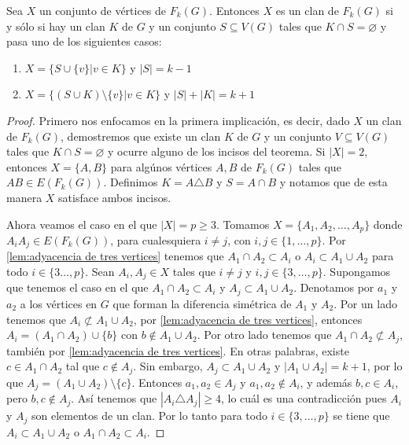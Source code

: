     \begin{teorema}
    \label{teo:relacion clan en G y F(G)}
        Sea $X$ un conjunto de v\'ertices de $F_k(G)$. Entonces $X$ es un clan
        de $F_k(G)$ si y s\'olo si hay un clan $K$ de $G$ y un conjunto $S
        \subseteq V(G)$ tales que $K \cap S = \varnothing$ y pasa uno de los
        siguientes casos:
        \begin{enumerate}
            \item $X = \{S \cup \{v\}| v \in K\}$ y $|S| = k-1$
            \item $X = \{(S\cup K) \setminus \{v\}| v \in K \}$ y $|S| + |K| =
            k+1$
        \end{enumerate}
    \end{teorema}

    \begin{proof}
        Primero nos enfocamos en la primera implicaci\'on, es decir, dado $X$ un
        clan de $F_k(G)$, demostremos que existe un clan $K$ de $G$ y un
        conjunto $V \subseteq V(G)$ tales que $K \cap S = \varnothing$ y ocurre
        alguno de los incisos del teorema. Si $|X|=2$, entonces $X= \{A, B\}$
        para alg\'unos v\'ertices $A, B$ de $F_k(G)$ tales que $AB \in
        E(F_k(G))$. Definimos $K = A \triangle B$ y $S=A \cap B$ y notamos que
        de esta manera $X$ satisface ambos incisos.

        Ahora veamos el caso en el que $|X|= p \geq 3$. Tomamos $X=\{A_1, A_2,
        \dots, A_p\}$ donde $A_i{A_j} \in E(F_k(G))$, para cualesquiera $i\neq
        j$, con $i,j \in \{1, \dots, p\}$. Por \cref{lem:adyacencia de tres
        vertices} tenemos que $A_1\cap A_2 \subset A_i$ o $A_i \subset A_1 \cup
        A_2$ para todo $i \in \{3 \dots,p \}$. Sean $A_i, A_j \in X$ tales que
        $i \neq j$ y $i, j \in \{3, \dots, p\}$. Supongamos que tenemos el caso
        en el que $A_1\cap A_2 \subset A_i$ y $A_j \subset A_1 \cup A_2$.
        Denotamos por $a_1$ y $a_2$ a los v\'ertices en $G$ que forman la
        diferencia sim\'etrica de $A_1$ y $A_2$. Por un lado tenemos que $A_i
        \not\subset A_1\cup A_2$, por \cref{lem:adyacencia de tres vertices},
        entonces $A_i = (A_1\cap A_2) \cup \{b\}$ con $b \notin A_1\cup A_2$.
        Por otro lado tenemos que $A_1 \cap A_2 \not\subset A_j$, tambi\'en por
        \cref{lem:adyacencia de tres vertices}. En otras palabras, existe $c \in
        A_1 \cap A_2$ tal que $c \notin A_j$. Sin embargo, $A_j \subset A_1 \cup
        A_2$ y $|A_1 \cup A_2| =k+1$, por lo que $A_j = (A_1 \cup A_2)\setminus
        \{c\}$. Entonces $a_1, a_2 \in A_j$ y $a_1, a_2 \notin A_i$, y adem\'as
        $b, c \in A_i$, pero $b, c \notin A_j$. As\'i tenemos que $|A_i
        \triangle A_j| \geq 4$, lo cu\'al es una contradicci\'on pues $A_i$ y
        $A_j$ son elementos de un clan. Por lo tanto para todo $i\in \{3, \dots,
        p\}$ se tiene que $A_i \subset A_1\cup A_2$ o $A_1 \cap A_2 \subset
        A_i$.


\end{proof}

